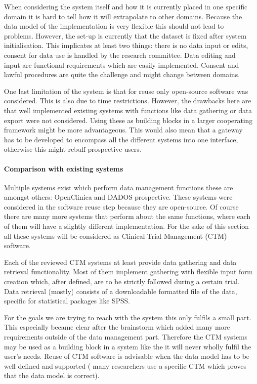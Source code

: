 When considering the system itself and how it is currently placed in one specific domain it is hard to tell how it will extrapolate to other domains.
Because the data model of the implementation is very flexible this should not lead to problems.
However, the set-up is currently that the dataset is fixed after system initialisation.
This implicates at least two things: there is no data input or edits, consent for data use is handled by the research committee.
Data editing and input are functional requirements which are easily implemented.
Consent and lawful procedures are quite the challenge and might change between domains.

One last limitation of the system is that for reuse only open-source software was considered.
This is also due to time restrictions.
However, the drawbacks here are that well implemented existing systems with functions like data gathering or data export were not considered.
Using these as building blocks in a larger cooperating framework might be more advantageous.
This would also mean that a gateway has to be developed to encompass all the different systems into one interface, otherwise this might rebuff prospective users.

\paragraph{Comparison with existing systems}
Multiple systems exist which perform data management functions these are amongst others: OpenClinica and DADOS prospective.
These systems were considered in the software reuse step because they are open-source.
Of course there are many more systems that perform about the same functions, where each of them will have a slightly different implementation.
For the sake of this section all these systems will be considered as Clinical Trial Management (CTM) software.

Each of the reviewed CTM systems at least provide data gathering and data retrieval functionality.
Most of them implement gathering with flexible input form creation which, after defined, are to be strictly followed during a certain trial.
Data retrieval (mostly) consists of a downloadable formatted file of the data, specific for statistical packages like SPSS.

For the goals we are trying to reach with the system this only fulfils a small part.
This especially became clear after the brainstorm which added many more requirements outside of the data management part.
Therefore the CTM systems may be used as a building block in a system like the \ivfsystem{} it will never wholly fulfil the user's needs.
Reuse of CTM software is advisable when the data model has to be well defined and supported (\ie{} many researchers use a specific CTM which proves that the data model is correct).

